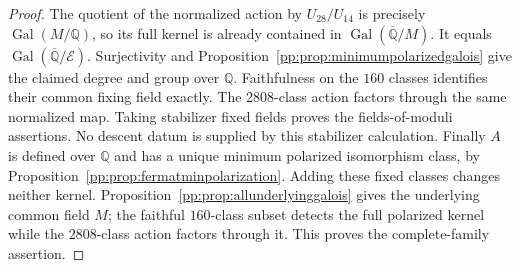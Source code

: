 \begin{proof}
The quotient of the normalized action by $U_{28}/U_{14}$ is precisely
$\operatorname{Gal}(M/\mathbb Q)$, so its full kernel is already
contained in $\operatorname{Gal}(\overline{\mathbb Q}/M)$.
It equals $\operatorname{Gal}(\overline{\mathbb Q}/\mathcal E)$.
Surjectivity and Proposition~\ref{pp:prop:minimumpolarizedgalois}
give the claimed degree and group over $\mathbb Q$. Faithfulness
on the $160$ classes identifies their common fixing field exactly.
The $2808$-class action factors through the same normalized map.
Taking stabilizer fixed fields proves the fields-of-moduli assertions.
No descent datum is supplied by this stabilizer calculation.
Finally $A$ is defined over $\mathbb Q$ and has a unique minimum
polarized isomorphism class, by
Proposition~\ref{pp:prop:fermatminpolarization}. Adding these fixed
classes changes neither kernel. Proposition~\ref{pp:prop:allunderlyinggalois}
gives the underlying common field $M$; the faithful $160$-class
subset detects the full polarized kernel while the $2808$-class
action factors through it. This proves the complete-family assertion.
\end{proof}


